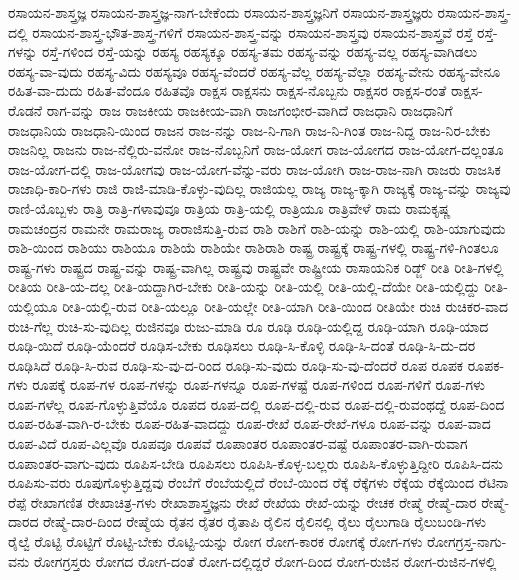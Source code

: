 {ರಸಾಯನ-ಶಾಸ್ತ್ರಜ್ಞ
ರಸಾಯನ-ಶಾಸ್ತ್ರಜ್ಞ-ನಾಗ-ಬೇಕೆಂದು
ರಸಾಯನ-ಶಾಸ್ತ್ರಜ್ಞನಿಗೆ
ರಸಾಯನ-ಶಾಸ್ತ್ರಜ್ಞರು
ರಸಾಯನ-ಶಾಸ್ತ್ರ-ದಲ್ಲಿ
ರಸಾಯನ-ಶಾಸ್ತ್ರ-ಭೌತ-ಶಾಸ್ತ್ರ-ಗಳಿಗೆ
ರಸಾಯನ-ಶಾಸ್ತ್ರ-ವನ್ನು
ರಸಾಯನ-ಶಾಸ್ತ್ರವು
ರಸಾಯನ-ಶಾಸ್ತ್ರವೆ
ರಸ್ತೆ
ರಸ್ತೆ-ಗಳನ್ನು
ರಸ್ತೆ-ಗಳಿಂದ
ರಸ್ತೆ-ಯನ್ನು
ರಹಸ್ಯ
ರಹಸ್ಯಕ್ಕೂ
ರಹಸ್ಯ-ತಮ
ರಹಸ್ಯ-ವನ್ನು
ರಹಸ್ಯ-ವಲ್ಲ
ರಹಸ್ಯ-ವಾಗಿಡಲು
ರಹಸ್ಯ-ವಾ-ವುದು
ರಹಸ್ಯ-ವಿದು
ರಹಸ್ಯವೂ
ರಹಸ್ಯ-ವೆಂದರೆ
ರಹಸ್ಯ-ವೆಲ್ಲ
ರಹಸ್ಯ-ವೆಲ್ಲಾ
ರಹಸ್ಯ-ವೇನು
ರಹಸ್ಯ-ವೇನೂ
ರಹಿತ-ವಾ-ದುದು
ರಹಿತ-ವೆಂದೂ
ರಹಿತವೊ
ರಾಕ್ಷಸ
ರಾಕ್ಷಸನು
ರಾಕ್ಷಸ-ನೊಬ್ಬನು
ರಾಕ್ಷಸರ
ರಾಕ್ಷಸ-ರಂತೆ
ರಾಕ್ಷಸ-ರೊಡನೆ
ರಾಗ-ವನ್ನು
ರಾಜ
ರಾಜಕೀಯ
ರಾಜಕೀಯ-ವಾಗಿ
ರಾಜಗಂಭೀರ-ವಾಗಿದೆ
ರಾಜಧಾನಿ
ರಾಜಧಾನಿಗೆ
ರಾಜಧಾನಿಯ
ರಾಜಧಾನಿ-ಯಿಂದ
ರಾಜನ
ರಾಜ-ನನ್ನು
ರಾಜ-ನಿ-ಗಾಗಿ
ರಾಜ-ನಿ-ಗಿಂತ
ರಾಜ-ನಿದ್ದ
ರಾಜ-ನಿರ-ಬೇಕು
ರಾಜನಿಲ್ಲ
ರಾಜನು
ರಾಜ-ನೆಲ್ಲಿರು-ವನೋ
ರಾಜ-ನೊಬ್ಬನಿಗೆ
ರಾಜ-ಯೋಗ
ರಾಜ-ಯೋಗದ
ರಾಜ-ಯೋಗ-ದಲ್ಲಂತೂ
ರಾಜ-ಯೋಗ-ದಲ್ಲಿ
ರಾಜ-ಯೋಗವು
ರಾಜ-ಯೋಗ-ವೆನ್ನು-ವರು
ರಾಜ-ಯೋಗಿ
ರಾಜ-ರಾಜ-ನಾಗಿ
ರಾಜರು
ರಾಜಸಿಕ
ರಾಜಾಧಿ-ಕಾರಿ-ಗಳು
ರಾಜಿ
ರಾಜಿ-ಮಾಡಿ-ಕೊಳ್ಳು-ವುದಿಲ್ಲ
ರಾಜಿಯಲ್ಲ
ರಾಜ್ಯ
ರಾಜ್ಯ-ಕ್ಕಾಗಿ
ರಾಜ್ಯಕ್ಕೆ
ರಾಜ್ಯ-ವನ್ನು
ರಾಜ್ಯವು
ರಾಣಿ-ಯೊಬ್ಬಳು
ರಾತ್ರಿ
ರಾತ್ರಿ-ಗಳಾವುವೂ
ರಾತ್ರಿಯ
ರಾತ್ರಿ-ಯಲ್ಲಿ
ರಾತ್ರಿಯೂ
ರಾತ್ರಿವೇಳೆ
ರಾಮ
ರಾಮಕೃಷ್ಣ
ರಾಮಚಂದ್ರನ
ರಾಮನೇ
ರಾಮರಾಜ್ಯ
ರಾರಾಜಿಸುತ್ತಿ-ರುವ
ರಾಶಿ
ರಾಶಿಗೆ
ರಾಶಿ-ಯನ್ನು
ರಾಶಿ-ಯಲ್ಲಿ
ರಾಶಿ-ಯಾಗುವುದು
ರಾಶಿ-ಯಿಂದ
ರಾಶಿಯು
ರಾಶಿಯೂ
ರಾಶಿಯೆ
ರಾಶಿಯೇ
ರಾಶಿರಾಶಿ
ರಾಷ್ಟ್ರ
ರಾಷ್ಟ್ರಕ್ಕೆ
ರಾಷ್ಟ್ರ-ಗಳಲ್ಲಿ
ರಾಷ್ಟ್ರ-ಗಳಿ-ಗಿಂತಲೂ
ರಾಷ್ಟ್ರ-ಗಳು
ರಾಷ್ಟ್ರದ
ರಾಷ್ಟ್ರ-ವನ್ನು
ರಾಷ್ಟ್ರ-ವಾಗಿಲ್ಲ
ರಾಷ್ಟ್ರವು
ರಾಷ್ಟ್ರವೇ
ರಾಷ್ಟ್ರೀಯ
ರಾಸಾಯನಿಕ
ರಿಡ್ಜ್
ರೀತಿ
ರೀತಿ-ಗಳಲ್ಲಿ
ರೀತಿಯ
ರೀತಿ-ಯ-ದಲ್ಲ
ರೀತಿ-ಯದ್ದಾಗಿರ-ಬೇಕು
ರೀತಿ-ಯನ್ನು
ರೀತಿ-ಯಲ್ಲಿ
ರೀತಿ-ಯಲ್ಲಿ-ದೆಯೇ
ರೀತಿ-ಯಲ್ಲಿದ್ದು
ರೀತಿ-ಯಲ್ಲಿಯೂ
ರೀತಿ-ಯಲ್ಲಿ-ರುವ
ರೀತಿ-ಯಲ್ಲೂ
ರೀತಿ-ಯಲ್ಲೇ
ರೀತಿ-ಯಾಗಿ
ರೀತಿ-ಯಿಂದ
ರೀತಿಯೇ
ರುಚಿ
ರುಚಿಕರ-ವಾದ
ರುಚಿ-ಗೆಲ್ಲ
ರುಚಿ-ಸು-ವುದಿಲ್ಲ
ರುಜಿನವೂ
ರುಜು-ಮಾಡಿ
ರೂ
ರೂಢಿ
ರೂಢಿ-ಯಲ್ಲಿದ್ದ
ರೂಢಿ-ಯಾಗಿ
ರೂಢಿ-ಯಾದ
ರೂಢಿ-ಯಿದೆ
ರೂಢಿ-ಯೆಂದರೆ
ರೂಢಿಸ-ಬೇಕು
ರೂಢಿಸಲು
ರೂಢಿ-ಸಿ-ಕೊಳ್ಳಿ
ರೂಢಿ-ಸಿ-ದಂತೆ
ರೂಢಿ-ಸಿ-ದು-ದರ
ರೂಢಿಸಿದೆ
ರೂಢಿ-ಸಿ-ರುವ
ರೂಢಿ-ಸು-ವು-ದ-ರಿಂದ
ರೂಢಿ-ಸು-ವುದು
ರೂಢಿ-ಸು-ವು-ದೆಂದರೆ
ರೂಪ
ರೂಪಕ
ರೂಪಕ-ಗಳು
ರೂಪಕ್ಕೆ
ರೂಪ-ಗಳ
ರೂಪ-ಗಳನ್ನು
ರೂಪ-ಗಳನ್ನೂ
ರೂಪ-ಗಳಷ್ಟೆ
ರೂಪ-ಗಳಿಂದ
ರೂಪ-ಗಳಿಗೆ
ರೂಪ-ಗಳು
ರೂಪ-ಗಳೆಲ್ಲ
ರೂಪ-ಗೊಳ್ಳುತ್ತಿವೆಯೊ
ರೂಪದ
ರೂಪ-ದಲ್ಲಿ
ರೂಪ-ದಲ್ಲಿ-ರುವ
ರೂಪ-ದಲ್ಲಿ-ರುವಂಥದ್ದೆ
ರೂಪ-ದಿಂದ
ರೂಪ-ರಹಿತ-ವಾಗಿ-ರ-ಬೇಕು
ರೂಪ-ರಹಿತ-ವಾದದ್ದು
ರೂಪ-ರೇಖೆ
ರೂಪ-ರೇಖೆ-ಗಳೂ
ರೂಪ-ವನ್ನು
ರೂಪ-ವಾದ
ರೂಪ-ವಿದೆ
ರೂಪ-ವಿಲ್ಲವೊ
ರೂಪವೂ
ರೂಪವೆ
ರೂಪಾಂತರ
ರೂಪಾಂತರ-ವಷ್ಟೆ
ರೂಪಾಂತರ-ವಾಗಿ-ರುವಾಗ
ರೂಪಾಂತರ-ವಾಗು-ವುದು
ರೂಪಿಸ-ಬೇಡಿ
ರೂಪಿಸಲು
ರೂಪಿಸಿ-ಕೊಳ್ಳ-ಬಲ್ಲರು
ರೂಪಿಸಿ-ಕೊಳ್ಳುತ್ತಿದ್ದೀರಿ
ರೂಪಿಸಿ-ದನು
ರೂಪಿಸು-ವರು
ರೂಪುಗೊಳ್ಳುತ್ತಿದ್ದವು
ರೆಂಬೆಗೆ
ರೆಂಬೆಯಲ್ಲಿದೆ
ರೆಂಬೆ-ಯಿಂದ
ರೆಕ್ಕೆ
ರೆಕ್ಕೆಗಳು
ರೆಕ್ಕೆಯ
ರೆಕ್ಕೆಯಿಂದ
ರೆಟಿನಾ
ರೆಪ್ಪೆ
ರೇಖಾಗಣಿತ
ರೇಖಾಚಿತ್ರ-ಗಳು
ರೇಖಾಶಾಸ್ತ್ರಜ್ಞನು
ರೇಖೆ
ರೇಖೆಯ
ರೇಖೆ-ಯನ್ನು
ರೇಚಕ
ರೇಷ್ಮೆ
ರೇಷ್ಮೆ-ದಾರ
ರೇಷ್ಮೆ-ದಾರದ
ರೇಷ್ಮೆ-ದಾರ-ದಿಂದ
ರೇಷ್ಮೆಯ
ರೈತನ
ರೈತರ
ರೈತಾಪಿ
ರೈಲಿನ
ರೈಲಿನಲ್ಲಿ
ರೈಲು
ರೈಲುಗಾಡಿ
ರೈಲುಬಂಡಿ-ಗಳು
ರೈಲ್ವೆ
ರೊಟ್ಟಿ
ರೊಟ್ಟಿಗೆ
ರೊಟ್ಟಿ-ಬೇಕು
ರೊಟ್ಟಿ-ಯನ್ನು
ರೋಗ
ರೋಗ-ಕಾರಕ
ರೋಗಕ್ಕೆ
ರೋಗ-ಗಳು
ರೋಗಗ್ರಸ್ತ-ನಾಗು-ವನು
ರೋಗಗ್ರಸ್ತರು
ರೋಗದ
ರೋಗ-ದಂತೆ
ರೋಗ-ದಲ್ಲಿದ್ದರೆ
ರೋಗ-ದಿಂದ
ರೋಗ-ರುಜಿನ
ರೋಗ-ರುಜಿನ-ಗಳಲ್ಲಿ
}
